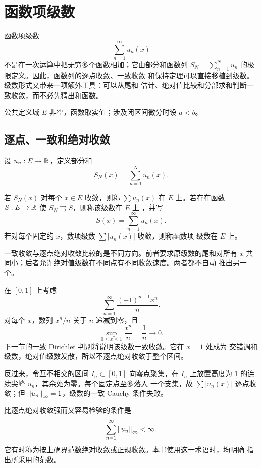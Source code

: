 \chapter{函数项级数}
\label{chap:function-series}

函数项级数
\[
 \sum_{n=1}^\infty u_n(x)
\]
不是在一次运算中把无穷多个函数相加；它由部分和函数列
\(S_N=\sum_{n=1}^Nu_n\) 的极限定义。因此，函数列的逐点收敛、一致收敛
和保持定理可以直接移植到级数。级数形式又带来一项额外工具：可以从尾和
估计、绝对值比较和分部求和判断一致收敛，而不必先猜出和函数。

公共定义域 \(E\) 非空，函数取实值；涉及闭区间微分时设 \(a<b\)。

\section{逐点、一致和绝对收敛}

设 \(u_n:E\to\mathbb{R}\)，定义部分和
\[
 S_N(x)=\sum_{n=1}^Nu_n(x).
\]

\begin{definition}
若 \(S_N(x)\) 对每个 \(x\in E\) 收敛，则称
\(\sum u_n(x)\) 在 \(E\) 上。若存在函数 \(S:E\to\mathbb{R}\)
使 \(S_N\rightrightarrows S\)，则称该级数在 \(E\) 上
，并写
\[
 S(x)=\sum_{n=1}^\infty u_n(x).
\]
若对每个固定的 \(x\)，数项级数 \(\sum |u_n(x)|\) 收敛，则称函数项
级数在 \(E\) 上。
\end{definition}

一致收敛与逐点绝对收敛比较的是不同方向。前者要求原级数的尾和对所有
\(x\) 共同小；后者允许绝对值级数在不同点有不同收敛速度。两者都不自动
推出另一个。

\begin{example}[一致但不绝对]
在 \([0,1]\) 上考虑
\[
 \sum_{n=1}^\infty\frac{(-1)^{n-1}x^n}{n}.
\]
对每个 \(x\)，数列 \(x^n/n\) 关于 \(n\) 递减到零，且
\[
 \sup_{0\le x\le1}\frac{x^n}{n}=\frac1n\to0.
\]
下一节的一致 Dirichlet 判别将说明该级数一致收敛。它在 \(x=1\) 处成为
交错调和级数，绝对值级数发散，所以不逐点绝对收敛于整个区间。
\end{example}

反过来，令互不相交的区间 \(I_n\subset[0,1]\) 向零点聚集，在 \(I_n\)
上放置高度为 \(1\) 的连续尖峰 \(u_n\)，其余处为零。每个固定点至多落入
一个支集，故 \(\sum|u_n(x)|\) 逐点收敛；但
\(\left\lVert u_n\right\rVert_\infty=1\)，级数的一致 Cauchy 条件失败。

比逐点绝对收敛强而又容易检验的条件是
\[
 \sum_{n=1}^\infty\left\lVert u_n\right\rVert_\infty<\infty.
\]
它有时称为按上确界范数绝对收敛或正规收敛。本书使用这一术语时，均明确
指出所采用的范数。

